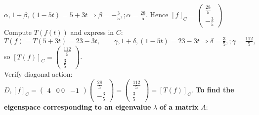 \documentclass{article}
\begin{document}
\begin{multicols*}{2}
$\alpha,1+\beta,(1-5t)=5+3t \Longrightarrow \beta=-\tfrac35,;\alpha=\tfrac{28}{5}.$
Hence $[f]_C=\begin{pmatrix}\tfrac{28}{5}\\-\tfrac35\end{pmatrix}$
\\Compute $T(f(t))$ and express in $C$:
\\$T(f)=T(5+3t)=23-3t,\qquad \gamma,1+\delta,(1-5t)=23-3t \Longrightarrow \delta=\tfrac35,;\gamma=\tfrac{112}{5},$
\\so $[T(f)]_C=\begin{pmatrix}\tfrac{112}{5}\\\tfrac35\end{pmatrix}$.
\\Verify diagonal action:
$D,[f]_C=\begin{pmatrix}4 & 0\ 0 & -1\end{pmatrix} \begin{pmatrix}\tfrac{28}{5}\\-\tfrac35\end{pmatrix}=\begin{pmatrix}\tfrac{112}{5}\\[4pt]\tfrac35\end{pmatrix} =[T(f)]_C.$
\textbf{To find the eigenspace corresponding to an eigenvalue } $\lambda$ \textbf{ of a matrix } $A$:


\end{multicols*}
\end{document}
